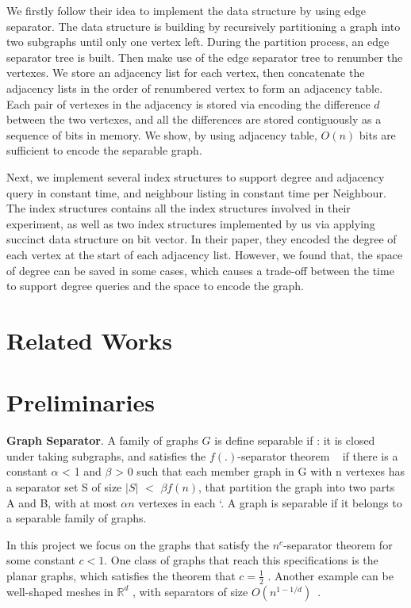 \documentclass[12pt,glossary]{dalthesis}
\begin{document}
We firstly follow their idea to implement the data structure by using edge separator. The data structure is building by recursively partitioning a graph into two subgraphs until only one vertex left. During the partition process, an edge separator tree is built. Then make use of the edge separator tree to renumber the vertexes. We store an adjacency list for each vertex, then concatenate the adjacency lists in the order of renumbered vertex to form an adjacency table. Each pair of vertexes in the adjacency is stored via encoding the difference $d$ between the two vertexes, and all the differences are stored contiguously as a sequence of bits in memory. We show, by using adjacency table, $O(n)$ bits are sufficient to encode the separable graph.

Next, we implement several index structures to support degree and adjacency query in
constant time, and neighbour listing in constant time per Neighbour. The index structures contains all the index structures involved in their experiment, as well as two index structures implemented by us via applying succinct data structure on bit vector. In their paper, they encoded the degree of each vertex at the start of each adjacency list. However, we found that, the space of degree can be saved in some cases, which causes a trade-off between the time to support degree queries and the space to encode the graph.

\section{Related Works}


\section{Preliminaries}

\textbf{Graph Separator}. A family of graphs $G$ is define separable if : it is closed under taking subgraphs, and satisfies the $f(.)$-separator theorem ~\cite{separator-theorem} if there is a constant $\alpha$ < 1 and $\beta$ > 0 such that each member graph in G with n vertexes has a separator set S of size $|S|$ $<$ $\beta f(n)$, that partition the graph into two parts A and B, with at most $\alpha n$ vertexes in each `\cite{separator-theorem}. A graph is separable if it belongs to a separable family of graphs. 

In this project we focus on the graphs that satisfy the $n^{c}$-separator theorem for some constant $c < 1$. One class of graphs that reach this specifications is the planar graphs, which satisfies the theorem that $c = \frac{1}{2}$ . Another example can be well-shaped meshes in $\mathbb{R}^{d}$ , with separators of size $O(n^{1-1/d})$~\cite{ separators-sphere-packing}.
\end{document}
